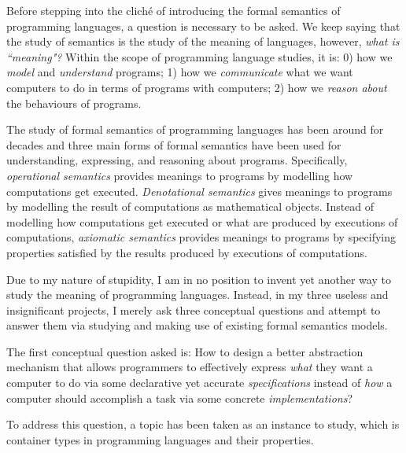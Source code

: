 Before stepping into the clich\'e of introducing the formal semantics of programming languages, a question is necessary to be asked. We keep saying that the study of semantics is the study of the meaning of languages, however, \emph{what is ``meaning"?} Within the scope of programming language studies, it is: 0) how we \emph{model} and \emph{understand} programs; 1) how we \emph{communicate} what we want computers to do in terms of programs with computers; 2) how we \emph{reason about} the behaviours of programs.

The study of formal semantics of programming languages has been around for decades and three main forms of formal semantics have been used for understanding, expressing, and reasoning about programs. Specifically, \emph{operational semantics} provides meanings to programs by modelling how computations get executed. \emph{Denotational semantics} gives meanings to programs by modelling the result of computations as mathematical objects. Instead of modelling how computations get executed or what are produced by executions of computations, \emph{axiomatic semantics} provides meanings to programs by specifying properties satisfied by the results produced by executions of computations. 

Due to my nature of stupidity, I am in no position to invent yet another way to study the meaning of programming languages. Instead, in my three useless and insignificant projects, I merely ask three conceptual questions and attempt to answer them via studying and making use of existing formal semantics models.

\begin{center}
\vspace{-0.7em}
\vspace{-0.3em}
\end{center}

The first conceptual question asked is: 
How to design a better abstraction mechanism that allows programmers to effectively express \emph{what} they want a computer to do via some declarative yet accurate \emph{specifications} instead of \emph{how} a computer should accomplish a task via some concrete \emph{implementations}?

To address this question, a topic has been taken as an instance to study, which is container types in programming languages and their properties. 

